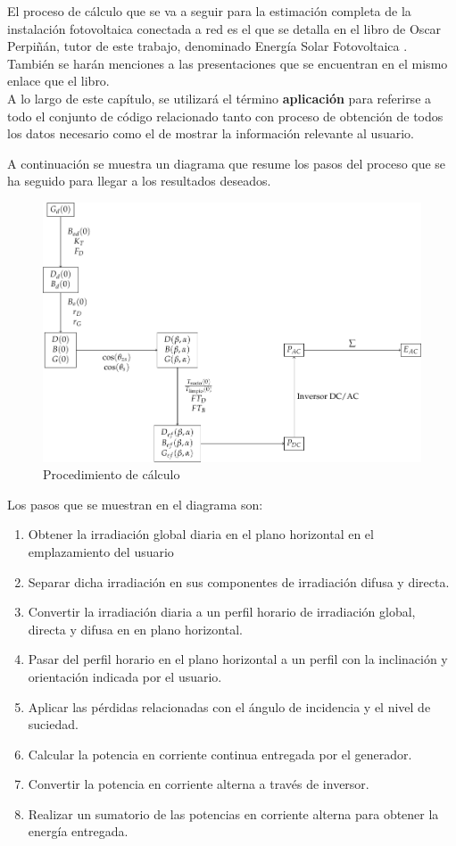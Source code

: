 
El proceso de cálculo que se va a seguir para la estimación completa de la instalación fotovoltaica conectada a red es el que se detalla en el libro de Oscar Perpiñán, tutor de este trabajo, denominado Energía Solar Fotovoltaica \cite{esf_book}. También se harán menciones a las presentaciones que se encuentran en el mismo enlace que el libro.\\

A lo largo de este capítulo, se utilizará el término \textbf{aplicación} para referirse a todo el conjunto de código relacionado tanto con proceso de obtención de todos los datos necesario como el de mostrar la información relevante al usuario.

A continuación se muestra un diagrama que resume los pasos del proceso que se ha seguido para llegar a los resultados deseados.

\begin{figure}[ht]
\includegraphics[scale=0.8]{diag_procedimiento_calculo}
\centering
\caption{Procedimiento de cálculo}
\label{fig:diag_procedimiento_calculo}
\end{figure}

Los pasos que se muestran en el diagrama son:
\begin{enumerate}
	\item Obtener la irradiación global diaria en el plano horizontal en el emplazamiento del usuario
	\item Separar dicha irradiación  en sus componentes de irradiación difusa y directa.
	\item Convertir la irradiación diaria a un perfil horario de irradiación global, directa y difusa en en plano horizontal.
	\item Pasar del perfil horario en el plano horizontal a un perfil con la inclinación y orientación indicada por el usuario.
	\item Aplicar las pérdidas relacionadas con el ángulo de incidencia y el nivel de suciedad.
	\item Calcular la potencia en corriente continua entregada por el generador.
	\item Convertir la potencia en corriente alterna a través de inversor.
	\item Realizar un sumatorio de las potencias en corriente alterna para obtener la energía entregada.
\end{enumerate}

